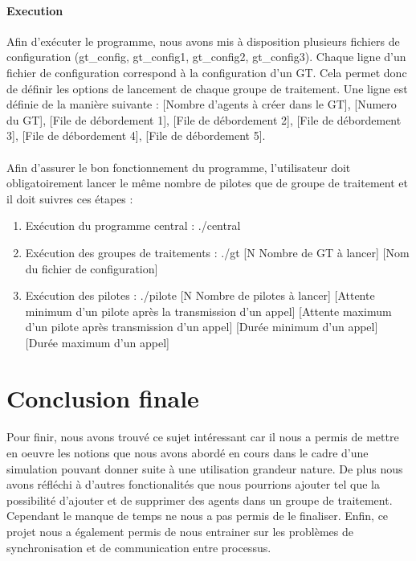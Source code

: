 \documentclass{report}
\begin{document}
		\paragraph{Execution}
			Afin d'exécuter le programme, nous avons mis à disposition plusieurs fichiers de configuration (gt\_config, gt\_config1, gt\_config2, gt\_config3). Chaque ligne d'un fichier de configuration correspond à la configuration d'un GT. Cela permet donc de définir les options de lancement de chaque groupe de traitement. Une ligne est définie de la manière suivante : [Nombre d'agents à créer dans le GT], [Numero du GT], [File de débordement 1], [File de débordement 2], [File de débordement 3], [File de débordement 4], [File de débordement 5].
		\paragraph{}
			Afin d'assurer le bon fonctionnement du programme, l'utilisateur doit obligatoirement lancer le même nombre de pilotes que de groupe de traitement et il doit suivres ces étapes :
			\begin{enumerate}
				\item Exécution du programme central : ./central
				\item Exécution des groupes de traitements : ./gt [N Nombre de GT à lancer] [Nom du fichier de configuration]
				\item Exécution des pilotes : ./pilote [N Nombre de pilotes à lancer] [Attente minimum d'un pilote après la transmission d'un appel] [Attente maximum d'un pilote après transmission d'un appel] [Durée minimum d'un appel] [Durée maximum d'un appel]
			\end{enumerate}

	\section{Conclusion finale}
		\paragraph{}
			Pour finir, nous avons trouvé ce sujet intéressant car il nous a permis de mettre en oeuvre les notions que nous avons abordé en cours dans le cadre d'une simulation pouvant donner suite à une utilisation grandeur nature. De plus nous avons réfléchi à d'autres fonctionalités que nous pourrions ajouter tel que la possibilité d'ajouter et de supprimer des agents dans un groupe de traitement. Cependant le manque de temps ne nous a pas permis de le finaliser. Enfin, ce projet nous a également permis de nous entrainer sur les problèmes de synchronisation et de communication entre processus. 
\end{document}
